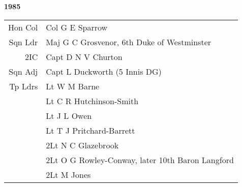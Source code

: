 \begin{center}
  \Huge
  \textbf{1985}
\end{center}

\begin{center}
  \small
  \begin{tabular}{rl}
    Hon Col & Col G E Sparrow \\
    Sqn Ldr & Maj G C Grosvenor, 6th Duke of Westminster \\
    2IC & Capt D N V Churton \\
    Sqn Adj & Capt L Duckworth (5 Innis DG) \\
    Tp Ldrs & Lt W M Barne \\
      & Lt C R Hutchinson-Smith \\
      & Lt J L Owen \\
      & Lt T J Pritchard-Barrett \\
      & 2Lt N C Glazebrook \\
      & 2Lt O G Rowley-Conway, later 10th Baron Langford \\
      & 2Lt M Jones \\
  \end{tabular}
\end{center}

